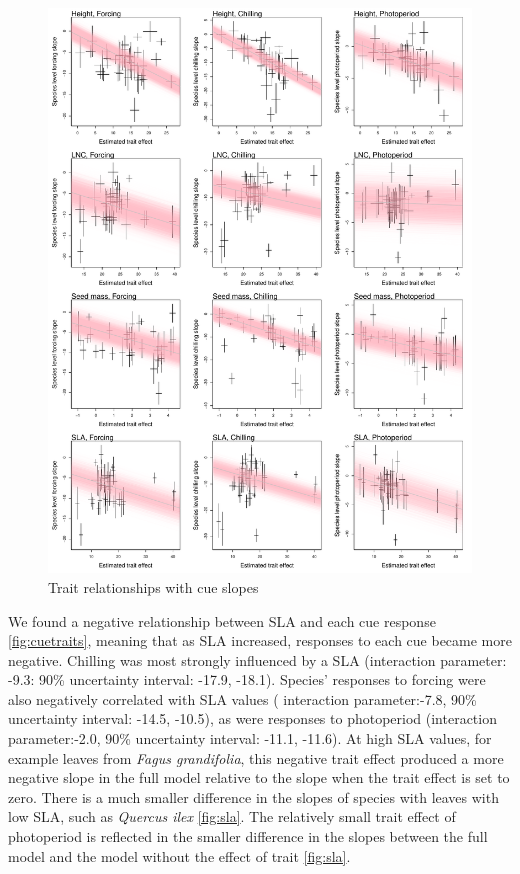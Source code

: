 \documentclass{article}\usepackage[]{graphicx}\usepackage[]{color}
\begin{document}
\begin{figure}[h!]
    \centering
 \includegraphics[width=\textwidth]{..//..//analyses/traits/figures/cuetrait_wtrend.pdf} 
    \caption{Trait relationships with cue slopes}
    \label{fig:cuetraits_wtrend}
\end{figure}


We found a negative relationship between SLA and each cue response  \ref{fig:cuetraits}, meaning that as SLA increased, responses to each cue became more negative. Chilling was most strongly influenced by a SLA (interaction parameter: -9.3: 90\% uncertainty interval: -17.9, -18.1). Species' responses to forcing were also negatively correlated with SLA values ( interaction parameter:-7.8, 90\% uncertainty interval: -14.5, -10.5), as were responses to photoperiod (interaction parameter:-2.0, 90\% uncertainty interval: -11.1, -11.6). At high SLA values, for example leaves from \textit{Fagus grandifolia}, this negative trait effect produced a more negative slope in the full model relative to the slope when the trait effect is set to zero. There is a much smaller difference in the slopes of species with leaves with low SLA, such as \textit{Quercus ilex} \ref{fig:sla}. The relatively small trait effect of photoperiod is reflected in the smaller difference in the slopes between the full model and the model without the effect of trait \ref{fig:sla}.
\end{document}
